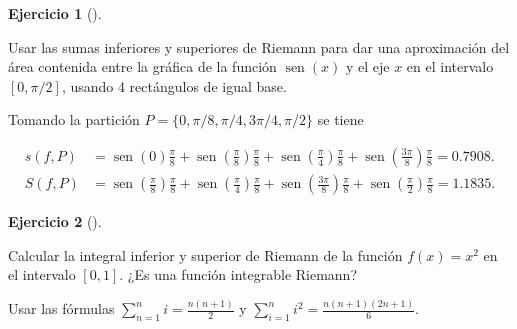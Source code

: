 \documentclass[
  spanish,
  a4paper,
]{scrreport}
\theoremstyle{definition}
\newtheorem{exercise}{Ejercicio}[chapter]
\theoremstyle{remark}
\begin{document}
\begin{exercise}[]\protect\hypertarget{exr-sumas-inferiores-superiores-seno-coseno}{}\label{exr-sumas-inferiores-superiores-seno-coseno}

Usar las sumas inferiores y superiores de Riemann para dar una
aproximación del área contenida entre la gráfica de la función
\(\operatorname{sen}(x)\) y el eje \(x\) en el intervalo \([0,\pi/2]\),
usando 4 rectángulos de igual base.

\end{exercise}

\begin{tcolorbox}[enhanced jigsaw, arc=.35mm, bottomrule=.15mm, bottomtitle=1mm, breakable, colback=white, colbacktitle=quarto-callout-tip-color!10!white, colframe=quarto-callout-tip-color-frame, coltitle=black, left=2mm, leftrule=.75mm, opacityback=0, opacitybacktitle=0.6, rightrule=.15mm, title=\textcolor{quarto-callout-tip-color}{\faLightbulb}\hspace{0.5em}{Solución}, titlerule=0mm, toprule=.15mm, toptitle=1mm]

Tomando la partición \(P=\{0, \pi/8, \pi/4, 3\pi/4, \pi/2\}\) se tiene

\begin{align*}
s(f,P) &= \operatorname{sen}(0)\frac{\pi}{8} + \operatorname{sen}\left(\frac{\pi}{8}\right) \frac{\pi}{8} + \operatorname{sen}\left(\frac{\pi}{4}\right) \frac{\pi}{8} + \operatorname{sen}\left(\frac{3\pi}{8}\right) \frac{\pi}{8} = 0.7908.\\
S(f,P) &= \operatorname{sen}\left(\frac{\pi}{8}\right) \frac{\pi}{8} + \operatorname{sen}\left(\frac{\pi}{4}\right) \frac{\pi}{8} + \operatorname{sen}\left(\frac{3\pi}{8}\right) \frac{\pi}{8} + \operatorname{sen}\left(\frac{\pi}{2}\right) \frac{\pi}{8} = 1.1835.
\end{align*}

\end{tcolorbox}

\begin{exercise}[]\protect\hypertarget{exr-integral-riemann-cuadrado}{}\label{exr-integral-riemann-cuadrado}

Calcular la integral inferior y superior de Riemann de la función
\(f(x)=x^2\) en el intervalo \([0,1]\). ¿Es una función integrable
Riemann?

\end{exercise}

\begin{tcolorbox}[enhanced jigsaw, arc=.35mm, bottomrule=.15mm, bottomtitle=1mm, breakable, colback=white, colbacktitle=quarto-callout-note-color!10!white, colframe=quarto-callout-note-color-frame, coltitle=black, left=2mm, leftrule=.75mm, opacityback=0, opacitybacktitle=0.6, rightrule=.15mm, title=\textcolor{quarto-callout-note-color}{\faInfo}\hspace{0.5em}{Pista}, titlerule=0mm, toprule=.15mm, toptitle=1mm]

Usar las fórmulas \(\sum_{n=1}^n i = \frac{n(n+1)}{2}\) y
\(\sum_{i=1}^n i^2 = \frac{n(n+1)(2n+1)}{6}\).

\end{tcolorbox}
\end{document}
